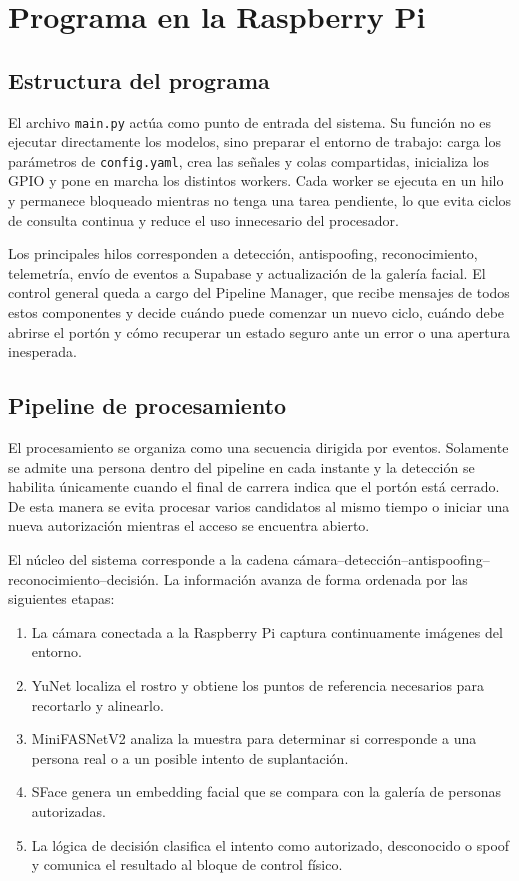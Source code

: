 \chapter{Programa en la Raspberry Pi}
\label{cap:programa}

\section{Estructura del programa}

El archivo \texttt{main.py} actúa como punto de entrada del sistema. Su función no es ejecutar directamente los modelos, sino preparar el entorno de trabajo: carga los parámetros de \texttt{config.yaml}, crea las señales y colas compartidas, inicializa los GPIO y pone en marcha los distintos workers. Cada worker se ejecuta en un hilo y permanece bloqueado mientras no tenga una tarea pendiente, lo que evita ciclos de consulta continua y reduce el uso innecesario del procesador.

Los principales hilos corresponden a detección, antispoofing, reconocimiento, telemetría, envío de eventos a Supabase y actualización de la galería facial. El control general queda a cargo del Pipeline Manager, que recibe mensajes de todos estos componentes y decide cuándo puede comenzar un nuevo ciclo, cuándo debe abrirse el portón y cómo recuperar un estado seguro ante un error o una apertura inesperada.

\section{Pipeline de procesamiento}

El procesamiento se organiza como una secuencia dirigida por eventos. Solamente se admite una persona dentro del pipeline en cada instante y la detección se habilita únicamente cuando el final de carrera indica que el portón está cerrado. De esta manera se evita procesar varios candidatos al mismo tiempo o iniciar una nueva autorización mientras el acceso se encuentra abierto.

El núcleo del sistema corresponde a la cadena cámara--detección--antispoofing--reconocimiento--decisión. La información avanza de forma ordenada por las siguientes etapas:

\begin{enumerate}
    \item La cámara conectada a la Raspberry Pi captura continuamente imágenes del entorno.
    \item YuNet localiza el rostro y obtiene los puntos de referencia necesarios para recortarlo y alinearlo.
    \item MiniFASNetV2 analiza la muestra para determinar si corresponde a una persona real o a un posible intento de suplantación.
    \item SFace genera un embedding facial que se compara con la galería de personas autorizadas.
    \item La lógica de decisión clasifica el intento como autorizado, desconocido o spoof y comunica el resultado al bloque de control físico.
\end{enumerate}

